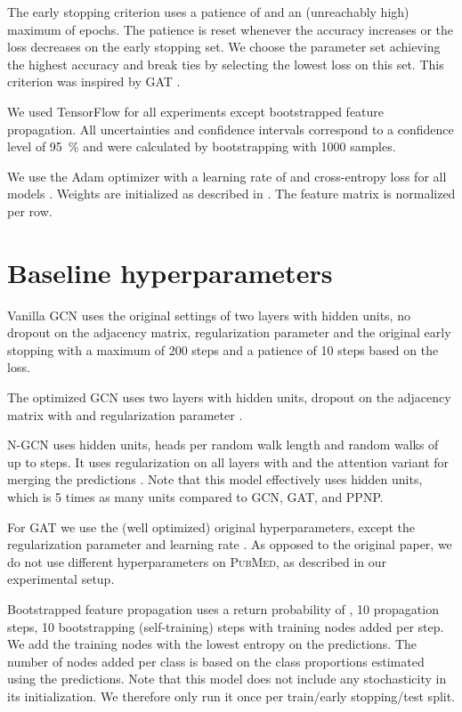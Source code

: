 \documentclass{article} \usepackage{iclr2019_conference,times}
\begin{document}
The early stopping criterion uses a patience of  and an (unreachably high) maximum of  epochs. The patience is reset whenever the accuracy increases or the loss decreases on the early stopping set. We choose the parameter set achieving the highest accuracy and break ties by selecting the lowest loss on this set. This criterion was inspired by GAT \citep{velickovic_graph_2018}.

We used TensorFlow \citep{martin_abadi_tensorflow:_2015} for all experiments except bootstrapped feature propagation. All uncertainties and confidence intervals correspond to a confidence level of \SI{95}{\percent} and were calculated by bootstrapping with \num{1000} samples.

We use the Adam optimizer with a learning rate of  and cross-entropy loss for all models \citep{kingma_adam:_2015}. Weights are initialized as described in \citet{glorot_understanding_2010}. The feature matrix is  normalized per row.

\newpage

\section{Baseline hyperparameters} \label{app:hyppar}

Vanilla GCN uses the original settings of two layers with  hidden units, no dropout on the adjacency matrix,  regularization parameter  and the original early stopping with a maximum of 200 steps and a patience of 10 steps based on the loss.

The optimized GCN uses two layers with  hidden units, dropout on the adjacency matrix with  and  regularization parameter .

N-GCN uses  hidden units,  heads per random walk length and random walks of up to  steps. It uses  regularization on all layers with  and the attention variant for merging the predictions \citep{abu-el-haija_n-gcn:_2018}. Note that this model effectively uses  hidden units, which is 5 times as many units compared to GCN, GAT, and PPNP.

For GAT we use the (well optimized) original hyperparameters, except the  regularization parameter  and learning rate . As opposed to the original paper, we do not use different hyperparameters on \textsc{PubMed}, as described in our experimental setup.

Bootstrapped feature propagation uses a return probability of , 10 propagation steps, 10 bootstrapping (self-training) steps with  training nodes added per step. We add the training nodes with the lowest entropy on the predictions. The number of nodes added per class is based on the class proportions estimated using the predictions. Note that this model does not include any stochasticity in its initialization. We therefore only run it once per train/early stopping/test split.
\end{document}
